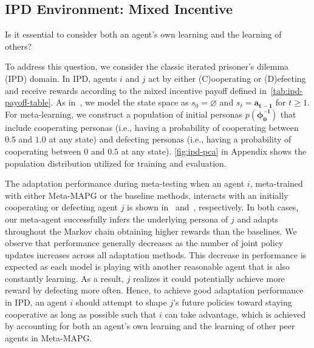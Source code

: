 \subsection{IPD Environment: Mixed Incentive}
\begin{question}
Is it essential to consider both an agent's own learning and the learning of others? \\[-2em]
\end{question}
To address this question, we consider the classic iterated prisoner's dilemma (IPD) domain. 
In IPD, agents $i$ and $j$ act by either (C)ooperating or (D)efecting and receive rewards according to the mixed incentive payoff defined in~\cref{tab:ipd-payoff-table}. 
As in~\citet{foerster17lola}, we model the state space as $s_{0}\!=\!\varnothing$ and $s_{t}\!=\!\bm{a}_{\bm{t-1}}$ for $t\geq1$.
For meta-learning, we construct a population of initial personas $p(\bm{\phi}^{\bm{-i}}_{\bm{0}})$ that include cooperating personas (i.e., having a probability of cooperating between $0.5$ and $1.0$ at any state) and defecting personas (i.e., having a probability of cooperating between $0$ and $0.5$ at any state).
\cref{fig:ipd-pca} in Appendix shows the population distribution utilized for training and evaluation.

The adaptation performance during meta-testing when an agent $i$, meta-trained with either Meta-MAPG or the baseline methods, interacts with an initially cooperating or defecting agent $j$ is shown in~ and~, respectively.
In both cases, our meta-agent successfully infers the underlying persona of $j$ and adapts throughout the Markov chain obtaining higher rewards than the baselines. 
We observe that performance generally decreases as the number of joint policy updates increases across all adaptation methods. 
This decrease in performance is expected as each model is playing with another reasonable agent that is also constantly learning. 
As a result, $j$ realizes it could potentially achieve more reward by defecting more often.
Hence, to achieve good adaptation performance in IPD, an agent $i$ should attempt to shape $j$'s future policies toward staying cooperative as long as possible such that $i$ can take advantage, which is achieved by accounting for both an agent's own learning and the learning of other peer agents in Meta-MAPG. 

